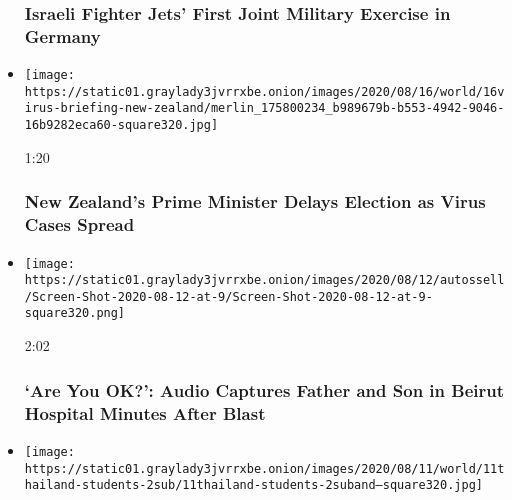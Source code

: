 \begin{itemize}
{  \subsubsection{Israeli Fighter Jets' First Joint Military Exercise in
  Germany}\label{israeli-fighter-jets-first-joint-military-exercise-in-germany}}
\item
  \href{https://www.nytimes3xbfgragh.onion/video/us/elections/100000007292203/new-zealand-delayed-election.html?action=click\&module=video-series-bar\&region=header\&pgtype=Article\&playlistId=video/world}{}

  \texttt{[image: https://static01.graylady3jvrrxbe.onion/images/2020/08/16/world/16virus-briefing-new-zealand/merlin\_175800234\_b989679b-b553-4942-9046-16b9282eca60-square320.jpg]}

  1:20

  \hypertarget{new-zealands-prime-minister-delays-election-as-virus-cases-spread}{%
  \subsubsection{New Zealand's Prime Minister Delays Election as Virus
  Cases
  Spread}\label{new-zealands-prime-minister-delays-election-as-virus-cases-spread}}
\item
  \href{https://www.nytimes3xbfgragh.onion/video/world/middleeast/100000007285123/beirut-blast-hospital-audio.html?action=click\&module=video-series-bar\&region=header\&pgtype=Article\&playlistId=video/world}{}

  \texttt{[image: https://static01.graylady3jvrrxbe.onion/images/2020/08/12/autossell/Screen-Shot-2020-08-12-at-9/Screen-Shot-2020-08-12-at-9-square320.png]}

  2:02

  \hypertarget{are-you-ok-audio-captures-father-and-son-in-beirut-hospital-minutes-after-blast}{%
  \subsubsection{`Are You OK?': Audio Captures Father and Son in Beirut
  Hospital Minutes After
  Blast}\label{are-you-ok-audio-captures-father-and-son-in-beirut-hospital-minutes-after-blast}}
\item
  \href{https://www.nytimes3xbfgragh.onion/video/us/politics/100000007283595/student-protest-thailand.html?action=click\&module=video-series-bar\&region=header\&pgtype=Article\&playlistId=video/world}{}

  \texttt{[image: https://static01.graylady3jvrrxbe.onion/images/2020/08/11/world/11thailand-students-2sub/11thailand-students-2suband--square320.jpg]}


\end{itemize}
